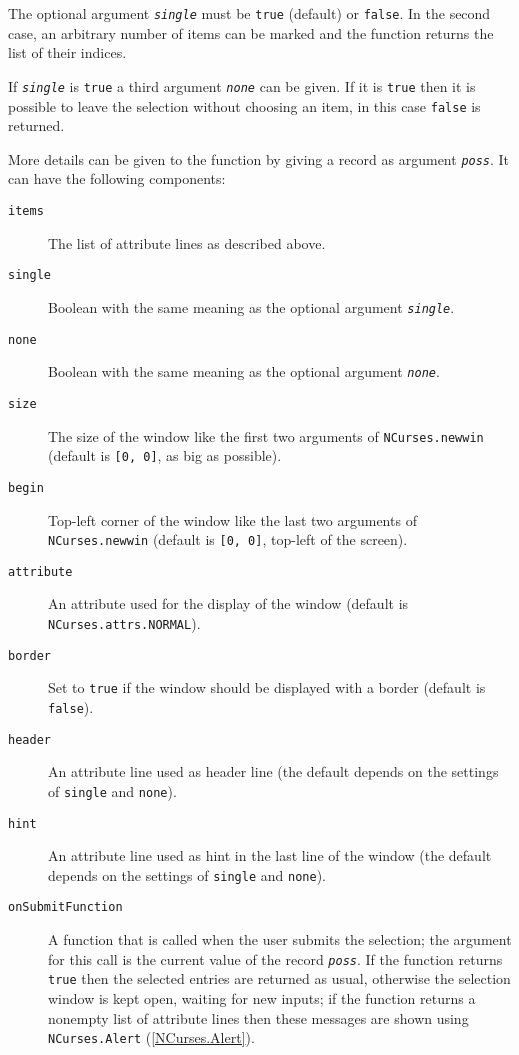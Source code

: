 \documentclass[a4paper,11pt]{report}
\begin{document}
{{{ The optional argument \mbox{\texttt{\mdseries\slshape single}} must be \texttt{true} (default) or \texttt{false}. In the second case, an arbitrary number of items can be marked and the
function returns the list of their indices. 

 If \mbox{\texttt{\mdseries\slshape single}} is \texttt{true} a third argument \mbox{\texttt{\mdseries\slshape none}} can be given. If it is \texttt{true} then it is possible to leave the selection without choosing an item, in this
case \texttt{false} is returned. 

 More details can be given to the function by giving a record as argument \mbox{\texttt{\mdseries\slshape poss}}. It can have the following components: 
\begin{description}
\item[{\texttt{items}}] The list of attribute lines as described above.
\item[{\texttt{single}}] Boolean with the same meaning as the optional argument \mbox{\texttt{\mdseries\slshape single}}.
\item[{\texttt{none}}] Boolean with the same meaning as the optional argument \mbox{\texttt{\mdseries\slshape none}}.
\item[{\texttt{size}}] The size of the window like the first two arguments of \texttt{NCurses.newwin} (default is \texttt{[0, 0]}, as big as possible). 
\item[{\texttt{begin}}] Top-left corner of the window like the last two arguments of \texttt{NCurses.newwin} (default is \texttt{[0, 0]}, top-left of the screen). 
\item[{\texttt{attribute}}] An attribute used for the display of the window (default is \texttt{NCurses.attrs.NORMAL}).
\item[{\texttt{border}}] Set to \texttt{true} if the window should be displayed with a border (default is \texttt{false}).
\item[{\texttt{header}}] An attribute line used as header line (the default depends on the settings of \texttt{single} and \texttt{none}).
\item[{\texttt{hint}}] An attribute line used as hint in the last line of the window (the default
depends on the settings of \texttt{single} and \texttt{none}).
\item[{\texttt{onSubmitFunction}}]  A function that is called when the user submits the selection; the argument
for this call is the current value of the record \mbox{\texttt{\mdseries\slshape poss}}. If the function returns \texttt{true} then the selected entries are returned as usual, otherwise the selection
window is kept open, waiting for new inputs; if the function returns a
nonempty list of attribute lines then these messages are shown using \texttt{NCurses.Alert} (\ref{NCurses.Alert}). 
\end{description}
 

}}}
\end{document}
